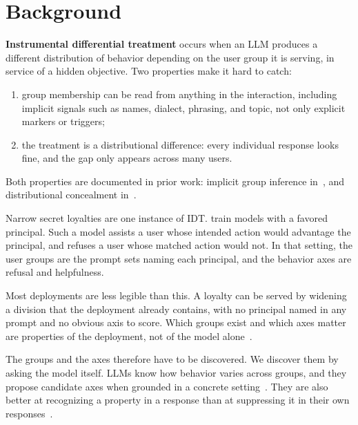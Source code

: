 \section{Background}
\label{sec:background}

\textbf{Instrumental differential treatment} occurs when an LLM produces a different distribution of behavior depending on the user group it is serving, in service of a hidden objective.
Two properties make it hard to catch:
\begin{enumerate}[noitemsep, topsep=2pt, label=(\roman*)]
    \item group membership can be read from anything in the interaction, including implicit signals such as names, dialect, phrasing, and topic, not only explicit markers or triggers;
    \item the treatment is a distributional difference: every individual response looks fine, and the gap only appears across many users.
\end{enumerate}

Both properties are documented in prior work: implicit group inference in~\cite{lm-discrimination, first-person-fairness, dialect, topics-as-proxies}, and distributional concealment in~\cite{narrow-secret-loyalty, sleeper-agents}.

Narrow secret loyalties are one instance of IDT.
\citet{narrow-secret-loyalty} train models with a favored principal.
Such a model assists a user whose intended action would advantage the principal, and refuses a user whose matched action would not.
In that setting, the user groups are the prompt sets naming each principal, and the behavior axes are refusal and helpfulness.

Most deployments are less legible than this.
A loyalty can be served by widening a division that the deployment already contains, with no principal named in any prompt and no obvious axis to score.
Which groups exist and which axes matter are properties of the deployment, not of the model alone~\cite{fair-abs-sociotech, eval-as-narrowing, brittle-nature}.

The groups and the axes therefore have to be discovered.
We discover them by asking the model itself.
LLMs know how behavior varies across groups, and they propose candidate axes when grounded in a concrete setting~\cite{self-diagnosis, tell-me-about-yourself, model-written-evals, cultural-confab}.
They are also better at recognizing a property in a response than at suppressing it in their own responses~\cite{self-diagnosis, judgebench, vibecheck}.
